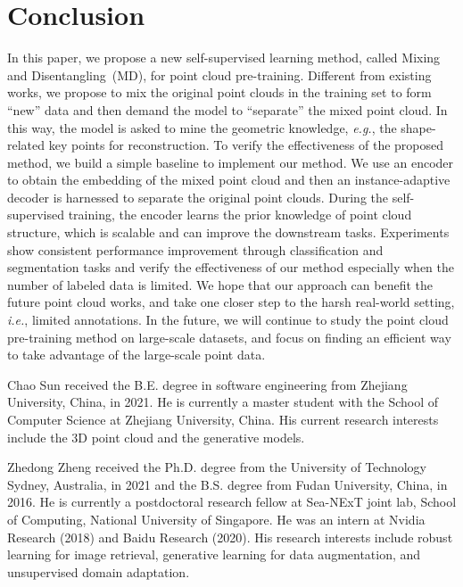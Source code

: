 \documentclass[journal]{IEEEtran}
\def\eg{\emph{e.g.}}
\def\ie{\emph{i.e.}}
\begin{document}
\section{Conclusion}
\label{sec:conclusion}
In this paper, we propose a new self-supervised learning method, called Mixing and Disentangling~(MD), for point cloud pre-training. Different from existing works, we propose to mix the original point clouds in the training set to form ``new'' data and then demand the model to ``separate'' the mixed point cloud. In this way, the model is asked to mine the geometric knowledge, \eg, the shape-related key points for reconstruction. To verify the effectiveness of the proposed method, we build a simple baseline to implement our method. We use an encoder to obtain the embedding of the mixed point cloud and then an instance-adaptive decoder is harnessed to separate the original point clouds. During the self-supervised training, the encoder learns the prior knowledge of point cloud structure, which is scalable and can improve the downstream tasks. Experiments show consistent performance improvement through classification and segmentation tasks and verify the effectiveness of our method especially when the number of labeled data is limited. 
We hope that our approach can benefit the future point cloud works, and take one closer step to the harsh real-world setting, \ie, limited annotations. In the future, we will continue to study the point cloud pre-training method on large-scale datasets, and focus on finding an efficient way to take advantage of the large-scale point data.



\begin{IEEEbiography}{Chao Sun} received the B.E. degree in software engineering from Zhejiang University, China, in 2021. He is currently a master student with the School of Computer Science at Zhejiang University, China. His current research interests include the 3D point cloud and the generative models. 
\end{IEEEbiography}

\begin{IEEEbiography}{Zhedong Zheng} received the Ph.D. degree from the University of Technology Sydney, Australia, in 2021 and the B.S. degree from Fudan University, China, in 2016. He is currently a postdoctoral research fellow at Sea-NExT joint lab, School of Computing, National University of Singapore. He was an intern at Nvidia Research (2018) and Baidu Research (2020). His research interests include robust learning for image retrieval, generative learning for data augmentation, and unsupervised domain adaptation.
\end{IEEEbiography}
\end{document}
